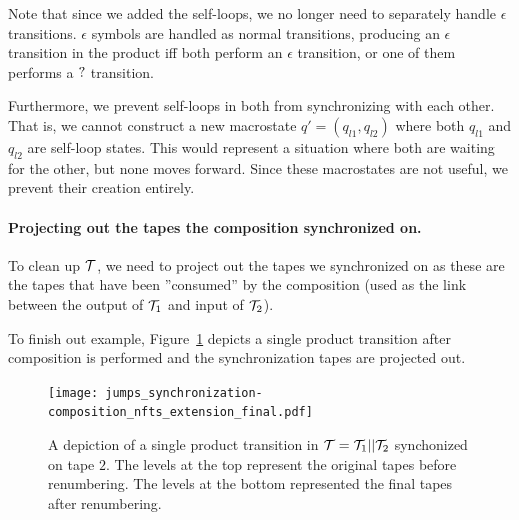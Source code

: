 Note that since we added the self-loops, we no longer need to separately handle $\epsilon$ transitions.
$\epsilon$ symbols are handled as normal transitions, producing an $\epsilon$ transition in the product iff both \nfts perform an $\epsilon$ transition, or one of them performs a $?$ transition.

Furthermore, we prevent self-loops in both \nfts from synchronizing with each other.
 That is, we cannot construct a new macrostate $q' = (q_{l1}, q_{l2})$ where both $q_{l1}$ and $q_{l2}$ are self-loop states.
This would represent a situation where both \nfts are waiting for the other, but none moves forward.
Since these macrostates are not useful, we prevent their creation entirely.

\paragraph{Projecting out the tapes the composition synchronized on.}
To clean up $\mathcal{T}$, we need to project out the tapes we synchronized on as these are the tapes that have been ''consumed'' by the composition (used as the link between the output of $\mathcal{T}_1$ and input of $\mathcal{T}_2$).

\begin{example}
  To finish out example, Figure~\ref{fig:composition_nfts_extension_final} depicts a single product transition after composition is performed and the synchronization tapes are projected out.
  \begin{figure}[ht]
    \centering
    \texttt{[image: jumps\_synchronization-composition\_nfts\_extension\_final.pdf]}
    \caption{
      A depiction of a single product transition in $\mathcal{T} = \mathcal{T}_1 || \mathcal{T}_2$ synchonized on tape $2$.
      The levels at the top represent the original tapes before renumbering.
      The levels at the bottom represented the final tapes after renumbering.
    }
    \label{fig:composition_nfts_extension_final}
  \end{figure}
\end{example}

